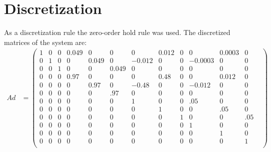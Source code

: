 \documentclass[]{article}
\begin{document}
\section{Discretization}
As a discretization rule the zero-order hold rule was used. The discretized matrices of the system are: \\
\begin{align*}
Ad &= \begin{pmatrix}
1	&0	&0&	0.049&	0	&0&	0&	0.012&	0	&0	&0.0003&	0 \\
0&	1&	0&	0&	0.049&	0&	-0.012&	0&	0&	-0.0003&	0&	0& \\
0	&0	&1&	0	&0	&0.049&	0	&0&	0&	0&	0&	0\\
0	&0	&0	&0.97&	0&	0&	0&	0.48&	0&	0&	0.012&	0 \\
0	&0	&0	&0	&0.97&	0&	-0.48&	0&	0&	-0.012&	0	&0& \\
0 &	0	&0	&0	&0	&.97&0	&0	&0	&0	&0	&0 \\
0 &	0	&0	&0	&0	&0	&1	&0	&0	&.05	&0	&0 \\
0 &	0	&0	&0	&0	&0	&0	&1	&0	&0	&.05	&0 \\
0 &	0	&0	&0	&0	&0	&0	&0	&1	&0	&0	&.05 \\
0 &	0	&0	&0	&0	&0	&0	&0	&0	&1	&0	&0 \\
0 &	0	&0	&0	&0	&0	&0	&0	&0	&0	&1	&0 \\
0 &	0	&0	&0	&0	&0	&0	&0	&0	&0	&0	&1 \\
\end{pmatrix} \\
\end{align*}
\end{document}
